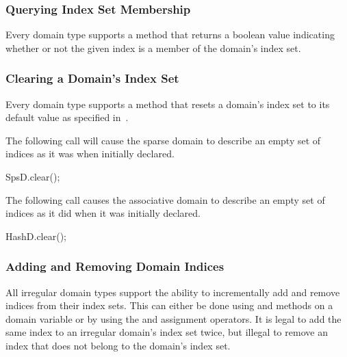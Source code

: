 \subsubsection{Querying Index Set Membership}
\label{Domain_Membership}

Every domain type supports a  method that returns a
boolean value indicating whether or not the given index  is a
member of the domain's index set.

%
%

\subsubsection{Clearing a Domain's Index Set}
\label{Clearing_Domain_Indices}

Every domain type supports a  method that resets a
domain's index set to its default value as specified
in~.

\begin{example}
The following call will cause the sparse domain  to
describe an empty set of indices as it was when initially declared.
\begin{chapel}
SpsD.clear();
\end{chapel}
\end{example}

\begin{example}
The following call causes the associative domain  to
describe an empty set of indices as it did when it was initially
declared.
\begin{chapel}
HashD.clear();
\end{chapel}
\end{example}

\subsubsection{Adding and Removing Domain Indices}
\label{Adding_and_Removing_Domain_Indices}

All irregular domain types support the ability to incrementally add
and remove indices from their index sets.  This can either be done
using  and  methods on a
domain variable or by using the \chpl{+=} and \chpl{-=} assignment
operators.  It is legal to add the same index to an irregular domain's
index set twice, but illegal to remove an index that does not belong
to the domain's index set.

